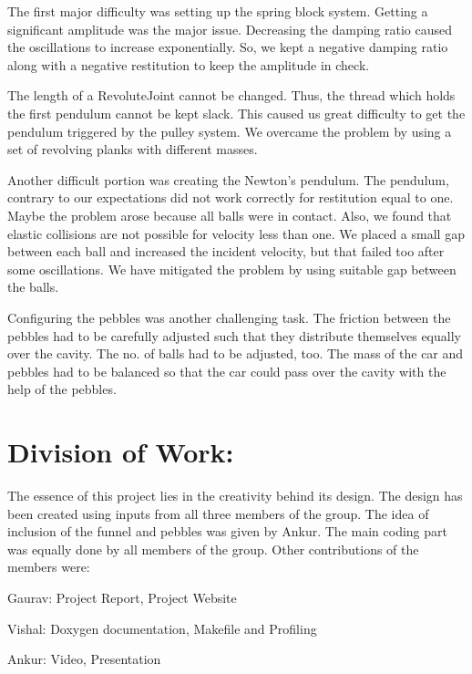 \documentclass{article}
\begin{document}
The first major difficulty was setting up the spring block system. Getting a significant amplitude was the major issue. Decreasing the damping ratio caused the oscillations to increase exponentially. So, we kept a negative damping ratio along with a negative restitution to keep the amplitude in check.

The length of a RevoluteJoint cannot be changed. Thus, the thread which holds the first pendulum cannot be kept slack. This caused us great difficulty to get the pendulum triggered by the pulley system. We overcame the problem by using a set of revolving planks with different masses.

Another difficult portion was creating the Newton's pendulum. The pendulum, contrary to our expectations did not work correctly for restitution equal to one. Maybe the problem arose because all balls were in contact. Also, we found that elastic collisions are not possible for velocity less than one. We placed a small gap between each ball and increased the incident velocity, but that failed too after some oscillations. We have mitigated the problem by using suitable gap between the balls.

Configuring the pebbles was another challenging task. The friction between the pebbles had to be carefully adjusted such that they distribute themselves equally over the cavity. The no. of balls had to be adjusted, too. The mass of the car and pebbles had to be balanced so that the car could pass over the cavity with the help of the pebbles.

\section*{Division of Work:}
The essence of this project lies in the creativity behind its design. The design has been created using inputs from all three members of the group. The idea of inclusion of the funnel and pebbles was given by Ankur. The main coding part was equally done by all members of the group. Other contributions of the members were:

Gaurav: Project Report, Project Website

Vishal: Doxygen documentation, Makefile and Profiling

Ankur: Video, Presentation

\nocite{*}
 

\end{document}
